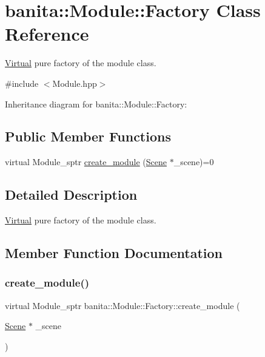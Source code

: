 \hypertarget{classbanita_1_1_module_1_1_factory}{}\section{banita\+::Module\+::Factory Class Reference}
\label{classbanita_1_1_module_1_1_factory}


\mbox{\hyperlink{class_virtual}{Virtual}} pure factory of the module class.  




{\ttfamily \#include $<$Module.\+hpp$>$}



Inheritance diagram for banita\+::Module\+::Factory\+:
\subsection*{Public Member Functions}
\begin{DoxyCompactItemize}
\item 
virtual Module\+\_\+sptr \mbox{\hyperlink{classbanita_1_1_module_1_1_factory_a47b2217b54d08bb35dc4c1673cf87d35}{create\+\_\+module}} (\mbox{\hyperlink{classbanita_1_1_scene}{Scene}} $\ast$\+\_\+scene)=0
\end{DoxyCompactItemize}


\subsection{Detailed Description}
\mbox{\hyperlink{class_virtual}{Virtual}} pure factory of the module class. 



\subsection{Member Function Documentation}
\mbox{\label{classbanita_1_1_module_1_1_factory_a47b2217b54d08bb35dc4c1673cf87d35}} 
\subsubsection{\texorpdfstring{create\_module()}{create\_module()}}
{\footnotesize\ttfamily virtual Module\+\_\+sptr banita\+::\+Module\+::\+Factory\+::create\+\_\+module (\begin{DoxyParamCaption}\item[{\mbox{\hyperlink{classbanita_1_1_scene}{Scene}} $\ast$}]{\+\_\+scene }\end{DoxyParamCaption})\hspace{0.3cm}{\ttfamily [pure virtual]}}



